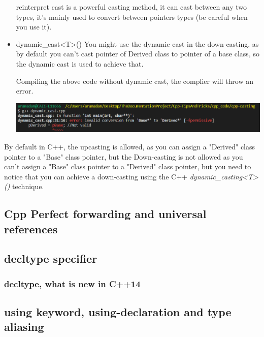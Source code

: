 \documentclass{article}
\begin{document}
\begin{itemize}
    reinterpret cast is a powerful casting method, it can cast between any two types, it's mainly used to convert between pointers types (be careful when you use it).

    

  \item dynamic\_cast<T>()
  You might use the dynamic cast in the down-casting, as by default you can't cast pointer of Derived class to pointer of a base class, so the dynamic cast is used to achieve that. 

  

  Compiling the above code without dynamic cast, the complier will throw an error.
  \begin{center}
    \includegraphics[scale=0.50]{./imgs/cpp_casting/dynamic_cast_downcasting.PNG}
  \end{center}
\end{itemize}

\begin{mybox}[title={Upcasting V.s. Downcasting}]
  By default in C++, the upcasting is allowed, as you can assign a "Derived" class pointer to a "Base" class pointer, but the Down-casting is not allowed as you can't assign a "Base" class pointer to a "Derived" class pointer, but you need to notice that you can achieve a down-casting using the C++ \textit{dynamic\_casting<T>()} technique.
\end{mybox}

\subsection{Cpp Perfect forwarding and universal references}

\subsection{decltype specifier}
\subsubsection{decltype, what is new in C++14}

\subsection{using keyword, using-declaration and type aliasing}
\end{document}
